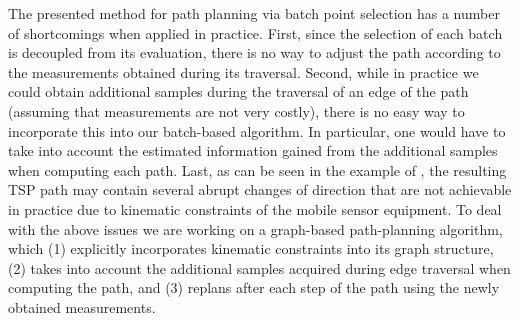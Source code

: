 The presented method for path planning via batch point selection has
a number of shortcomings when applied in practice.
First, since the selection of each batch is decoupled from its evaluation,
there is no way to adjust the path according to the measurements obtained
during its traversal.
Second, while in practice we could obtain additional samples during the
traversal of an edge of the path (assuming that measurements are not
very costly), there is no easy way to incorporate this into our batch-based
algorithm. In particular, one would have to take into account the
estimated information gained from the additional samples when computing
each path.
Last, as can be seen in the example of ,
the resulting TSP path may contain several abrupt changes of direction that
are not achievable in practice due to kinematic constraints of the mobile
sensor equipment.
To deal with the above issues we are working on a graph-based
path-planning algorithm, which (1) explicitly incorporates kinematic
constraints into its graph structure, (2) takes into account the additional
samples acquired during edge traversal when computing the path,
and (3) replans after each step of the path using the newly obtained
measurements.

